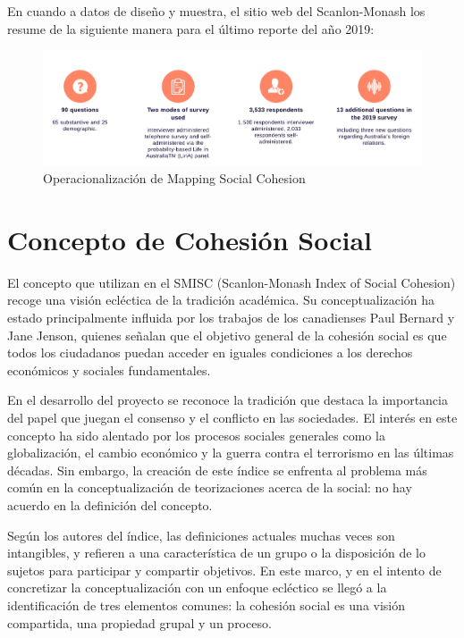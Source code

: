 \documentclass[
  12pt,
]{book}
\begin{document}
En cuando a datos de diseño y muestra, el sitio web del Scanlon-Monash los resume de la siguiente manera para el último reporte del año 2019:

\begin{figure}[H]

{\centering \includegraphics[width=0.75\linewidth]{inputs/images/scanlon2019} 

}

\caption{Operacionalización de Mapping Social Cohesion}\label{fig:mapping2}
\end{figure}

\hypertarget{concepto-de-cohesiuxf3n-social}{%
\section{Concepto de Cohesión Social}\label{concepto-de-cohesiuxf3n-social}}

El concepto que utilizan en el SMISC (Scanlon-Monash Index of Social Cohesion) recoge una visión ecléctica de la tradición académica. Su conceptualización ha estado principalmente influida por los trabajos de los canadienses Paul Bernard y Jane Jenson, quienes señalan que el objetivo general de la cohesión social es que todos los ciudadanos puedan acceder en iguales condiciones a los derechos económicos y sociales fundamentales.

En el desarrollo del proyecto se reconoce la tradición que destaca la importancia del papel que juegan el consenso y el conflicto en las sociedades. El interés en este concepto ha sido alentado por los procesos sociales generales como la globalización, el cambio económico y la guerra contra el terrorismo en las últimas décadas. Sin embargo, la creación de este índice se enfrenta al problema más común en la conceptualización de teorizaciones acerca de la social: no hay acuerdo en la definición del concepto.

Según los autores del índice, las definiciones actuales muchas veces son intangibles, y refieren a una característica de un grupo o la disposición de lo sujetos para participar y compartir objetivos. En este marco, y en el intento de concretizar la conceptualización con un enfoque ecléctico se llegó a la identificación de tres elementos comunes: la cohesión social es una visión compartida, una propiedad grupal y un proceso.
\end{document}
